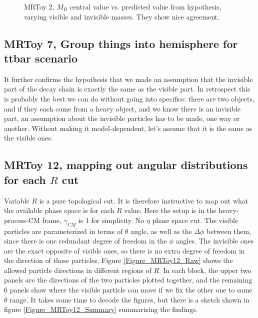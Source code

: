 \documentclass{fheadnote}
\begin{document}
\begin{figure}[htbp]
   \caption{MRToy 2, $M_R$ central value vs. predicted value from hypothesis, varying visible and invisible masses.  They show nice agreement.}
   \label{Figure_MRToy2}
\end{figure}

\subsection{MRToy 7, Group things into hemisphere for ttbar scenario}

It further confirms the hypothesis that we made an assumption that the invisible part of the decay chain is exactly the same as the visible part.
In retrospect this is probably the best we can do without going into specifics: there are two objects, and if they each come from a heavy object,
and we know there is an invisible part, an assumption about the invisible particles has to be made, one way or another.
Without making it model-dependent, let's assume that it is the same as the visible ones.



\subsection{MRToy 12, mapping out angular distributions for each $R$ cut}

Variable $R$ is a pure topological cut.  It is therefore instructive to map out what the available phase space is for each $R$ value.
Here the setup is in the heavy-process-CM frame, $\gamma_{CM}$ is 1 for simplicity.  No $\eta$ phase space cut.
The visible particles are parameterized in terms of $\theta$ angle, as well as the $\Delta\phi$ between them, since there is
one redundant degree of freedom in the $\phi$ angles.
The invisible ones are the exact opposite of visible ones, so there is no extra degree of freedom in the direction of those particles.
Figure \ref{Figure_MRToy12_Raw} shows the allowed particle directions in different regions of $R$.
In each block, the upper two panels are the directions of the two particles plotted together,
and the remaining 6 panels show where the visible particle can move if we fix the other one to some $\theta$ range.
It takes some time to decode the figures, but there is a sketch shown in figure \ref{Figure_MRToy12_Summary}
summarizing the findings.
\end{document}
